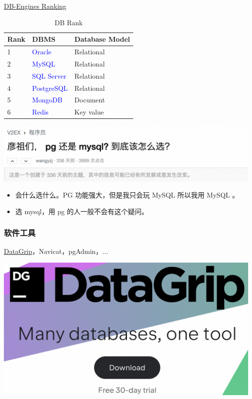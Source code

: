 \documentclass[aspectratio=169, 14pt]{beamer}
\begin{document}
\begin{frame}
\href{https://db-engines.com/en/ranking}{DB-Engines Ranking} 

\begin{table}
    \caption{DB Rank}
    \begin{tabular}{lll}
      \toprule
      Rank & DBMS & Database Model \\
      \midrule
      1 & \textcolor{blue}{Oracle} & Relational \\
      2 & \textcolor{blue}{MySQL} & Relational \\
      3 & \textcolor{blue}{SQL Server} & Relational \\
      4 & \textcolor{blue}{PostgreSQL} & Relational \\
      5 & \textcolor{blue}{MongoDB} & Document \\
      6 & \textcolor{blue}{Redis} & Key value \\
      \bottomrule
    \end{tabular}
\end{table}
\end{frame}

\begin{frame}
    \includegraphics[width=.9\paperwidth]{image/pg-mysql1}
    \begin{itemize}
        \item 会什么选什么。PG 功能强大，但是我只会玩 MySQL 所以我用 MySQL 。
        \item 选 mysql，用 pg 的人一般不会有这个疑问。
    \end{itemize}
\end{frame}

\begin{frame}
    \frametitle{软件工具}    
\href{https://www.jetbrains.com/datagrip/}{DataGrip}，Navicat，pgAdmin，...

\begin{center}
    \includegraphics[width=.55\paperwidth]{image/datagrip}
\end{center}

\end{frame}
\end{document}
